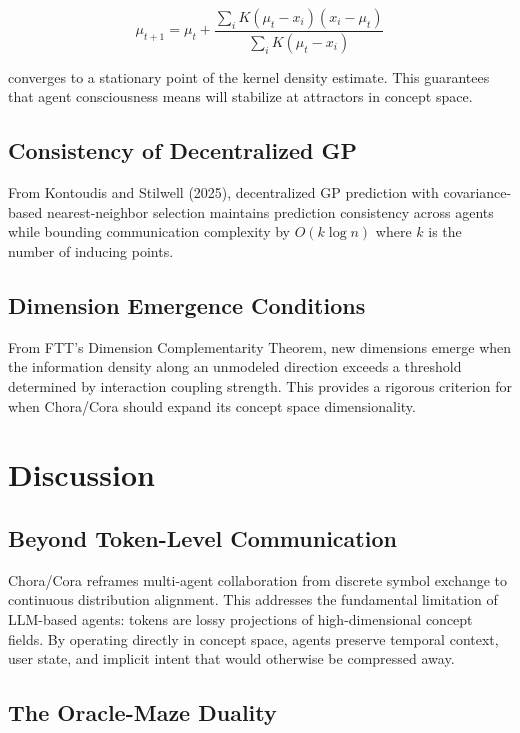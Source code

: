 \documentclass[11pt]{article}
\begin{document}
\begin{equation}
\mu_{t+1} = \mu_t + \frac{\sum_{i} K(\mu_t - x_i)(x_i - \mu_t)}{\sum_{i} K(\mu_t - x_i)}
\end{equation}

converges to a stationary point of the kernel density estimate. This guarantees that agent consciousness means will stabilize at attractors in concept space.

\subsection{Consistency of Decentralized GP}

From Kontoudis and Stilwell (2025), decentralized GP prediction with covariance-based nearest-neighbor selection maintains prediction consistency across agents while bounding communication complexity by $O(k \log n)$ where $k$ is the number of inducing points.

\subsection{Dimension Emergence Conditions}

From FTT's Dimension Complementarity Theorem, new dimensions emerge when the information density along an unmodeled direction exceeds a threshold determined by interaction coupling strength. This provides a rigorous criterion for when Chora/Cora should expand its concept space dimensionality.

\section{Discussion}

\subsection{Beyond Token-Level Communication}

Chora/Cora reframes multi-agent collaboration from discrete symbol exchange to continuous distribution alignment. This addresses the fundamental limitation of LLM-based agents: tokens are lossy projections of high-dimensional concept fields. By operating directly in concept space, agents preserve temporal context, user state, and implicit intent that would otherwise be compressed away.

\subsection{The Oracle-Maze Duality}
\end{document}
